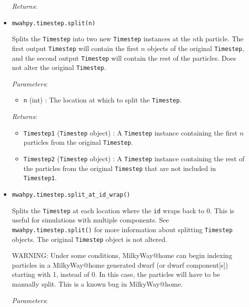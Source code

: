 \documentclass{article}
\begin{document}
\begin{itemize}
\begin{itemize}
\end{itemize}

\textit{Returns}: 



\item \verb!mwahpy.timestep.split(n)!

Splits the \verb!Timestep! into two new \verb!Timestep! instances at the $n$th particle. The first output \verb!Timestep! will contain the first $n$ objects of the original \verb!Timestep!, and the second output \verb!Timestep! will contain the rest of the particles. Does not alter the original \verb!Timestep!. 

\textit{Parameters}: \begin{itemize}

\item \verb!n! (int) : The location at which to split the \verb!Timestep!. 

\end{itemize}

\textit{Returns}:  \begin{itemize}

\item \verb!Timestep1! (\verb!Timestep! object) : A \verb!Timestep! instance containing the first $n$ particles from the original \verb!Timestep!.

\item \verb!Timestep2! (\verb!Timestep! object) : A \verb!Timestep! instance containing the rest of the particles from the original \verb!Timestep! that are not included in \verb!Timestep1!.

\end{itemize}



\item \verb!mwahpy.timestep.split_at_id_wrap()!

Splits the \verb!Timestep! at each location where the \verb!id! wraps back to 0. This is useful for simulations with multiple components. See \verb!mwahpy.timestep.split()! for more information about splitting \verb!Timestep! objects. The original \verb!Timestep! object is not altered.

WARNING: Under some conditions, MilkyWay@home can begin indexing particles in a MilkyWay@home generated dwarf (or dwarf component[s]) starting with 1, instead of 0. In this case, the particles will have to be manually split. This is a known bug in MilkyWay@home.

\textit{Parameters}:


\end{itemize}
\end{document}
